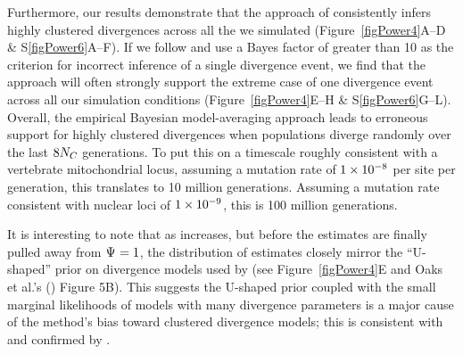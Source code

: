 Furthermore, our results demonstrate that the approach of \citet{Hickerson2013}
consistently infers highly clustered divergences across all the  we
simulated (Figure~\ref{figPower4}A--D \& S\ref{figPower6}A--F).
If we follow \citet{Hickerson2013} and use a Bayes factor of greater than 10 as
the criterion for incorrect inference of a single divergence event, we find
that the approach will often strongly support the extreme case of one
divergence event across all our simulation conditions (Figure~\ref{figPower4}E--H \&
S\ref{figPower6}G--L).
Overall, the empirical Bayesian model-averaging approach leads to erroneous
support for highly clustered divergences when populations diverge randomly over
the last $8N_C$ generations.
To put this on a timescale roughly consistent with a vertebrate mitochondrial
locus, assuming a mutation rate of $1\times 10^{-8}$ per site per generation, this
translates to 10 million generations.
Assuming a mutation rate consistent with nuclear loci of $1\times 10^{-9}$, this is 100
million generations.

It is interesting to note that as  increases, but before the
estimates are finally pulled away from $\Psi_{} = 1$, the distribution of
\numt{} estimates closely mirror the ``U-shaped'' prior on divergence models
used by \msb (see Figure~\ref{figPower4}E and Oaks et al.'s
(\citeyear{Oaks2012}) Figure 5B).
This suggests the U-shaped prior coupled with the small marginal likelihoods
of models with many divergence parameters is a major cause of the method's
bias toward clustered divergence models; this is consistent with
\citet{Oaks2012} and confirmed by \citet{Oaks2014dpp}.


